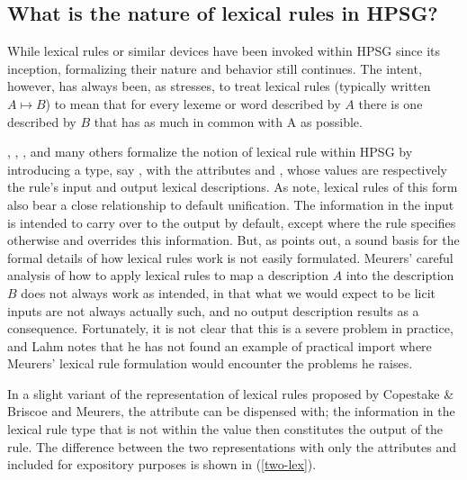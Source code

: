\documentclass[output=paper]{langsci/langscibook}
\begin{document}
\subsection{What is the nature of lexical rules in HPSG?}

While lexical rules or similar devices have been invoked within HPSG since its inception, formalizing their nature and behavior still  continues.
The intent, however, has always been, as \citet{Lahm2016} stresses, to treat lexical rules (typically written $A \mapsto B$) to mean that for every lexeme or word described by $A$ there is one described by $B$ that has as much in common with A as possible.

\citet{CopestakeandBriscoe1991}, \citet{BriscoeandCopestake1999}, \citet{Meurers2001}, and many others formalize the notion of lexical rule within HPSG by introducing a type, say , with the attributes  and , whose values are respectively the rule's input and output lexical descriptions. As \citet{BriscoeandCopestake1999} note, lexical rules of this form also bear a close relationship to default unification.
The information in the input is intended to carry over to the output by default, except where the rule specifies otherwise and overrides this information. But, as \citet{Lahm2016} points out, a sound basis for the formal details of how lexical rules work is not easily formulated. Meurers' careful analysis of how to apply lexical rules to map a description $A$ into the description $B$ does not always work as intended, in that what we would expect to be licit inputs are not always actually such, and no output description results as a consequence. Fortunately,  it is not clear that this is a severe problem in practice, and Lahm notes that he has not found an example of practical import where Meurers' lexical rule formulation would encounter the problems he raises.

In a slight variant of the representation of lexical rules proposed by Copestake \& Briscoe and Meurers, the  attribute can be dispensed with; the information in the lexical rule type that is not within the  value then constitutes the output of the rule. The difference between the two representations with only the attributes  and  included for expository purposes is shown in (\ref{two-lex}).
\end{document}
